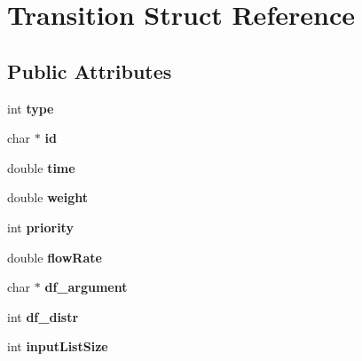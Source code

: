 \hypertarget{structTransition}{\section{Transition Struct Reference}
\label{structTransition}
}
\subsection*{Public Attributes}
\begin{DoxyCompactItemize}
\item 
\hypertarget{structTransition_a805ae5d009fcac5d7f46fd463470ce07}{int {\bfseries type}}\label{structTransition_a805ae5d009fcac5d7f46fd463470ce07}

\item 
\hypertarget{structTransition_a43474faab866ad2a5cdbd17fbc568312}{char $\ast$ {\bfseries id}}\label{structTransition_a43474faab866ad2a5cdbd17fbc568312}

\item 
\hypertarget{structTransition_ada913a006d7b1fef09d3265de5005f74}{double {\bfseries time}}\label{structTransition_ada913a006d7b1fef09d3265de5005f74}

\item 
\hypertarget{structTransition_ab779916e07d91bc5162b86661e5fc3e2}{double {\bfseries weight}}\label{structTransition_ab779916e07d91bc5162b86661e5fc3e2}

\item 
\hypertarget{structTransition_a78c269a5c47d9c0622c441cd8271ac60}{int {\bfseries priority}}\label{structTransition_a78c269a5c47d9c0622c441cd8271ac60}

\item 
\hypertarget{structTransition_a98ffbaa4092f7ce9f6d30789260e1e6b}{double {\bfseries flow\-Rate}}\label{structTransition_a98ffbaa4092f7ce9f6d30789260e1e6b}

\item 
\hypertarget{structTransition_a75d816d622d2a43ab97de0b5eaf25d37}{char $\ast$ {\bfseries df\-\_\-argument}}\label{structTransition_a75d816d622d2a43ab97de0b5eaf25d37}

\item 
\hypertarget{structTransition_a8e1caa51ca0ef8fa008318ac5d4d0d9c}{int {\bfseries df\-\_\-distr}}\label{structTransition_a8e1caa51ca0ef8fa008318ac5d4d0d9c}

\item 
\hypertarget{structTransition_a2a7a93fbc4bd373198081351db626313}{int {\bfseries input\-List\-Size}}\label{structTransition_a2a7a93fbc4bd373198081351db626313}


\end{DoxyCompactItemize}
